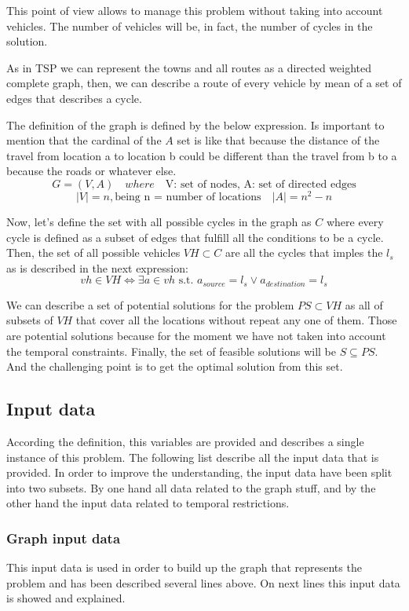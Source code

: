 \documentclass[]{report}
\begin{document}
This point of view allows to manage this problem without taking into account vehicles. The number of vehicles will be, in fact, the number of cycles in the solution.

As in TSP we can represent the towns and all routes as a directed weighted complete graph, then, we can describe a route of every vehicle by mean of a set of edges that describes a cycle.

The definition of the graph is defined by the below expression. Is important to mention that the cardinal of the $A$ set is like that because the distance of the travel from location a to location b could be different than the travel from b to a because the roads or whatever else.
$$G=(V,A) \quad where \quad \text{V: set of nodes, A: set of directed edges}$$
$$|V|=n, \text{being n = number of locations} \quad |A|=n^{2}-n$$

Now, let's define the set with all possible cycles in the graph as $C$ where every cycle is defined as a subset of edges that fulfill all the conditions to be a cycle. Then, the set of all possible vehicles $VH \subset C$ are all the cycles that imples the $l_{s}$ as is described in the next expression:
$$vh \in VH \Leftrightarrow \exists a \in vh \text{ s.t. } a_{source} = l_{s} \lor a_{destination} = l_{s}$$

We can describe a set of potential solutions for the problem $PS \subset VH$ as all of subsets of $VH$ that cover all the locations without repeat any one of them. Those are potential solutions because for the moment we have not taken into account the temporal constraints. Finally, the set of feasible solutions will be $S \subseteq PS$. And the challenging point is to get the optimal solution from this set.

\subsection{Input data}

According the definition, this variables are provided and describes a single instance of this problem. The following list describe all the input data that is provided. In order to improve the understanding, the input data have been split into two subsets. By one hand all data related to the graph stuff, and by the other hand the input data related to temporal restrictions.

\subsubsection{Graph input data}\label{sss:graph_constraints}
This input data is used in order to build up the graph that represents the problem and has been described several lines above. On next lines this input data is showed and explained.
\end{document}

